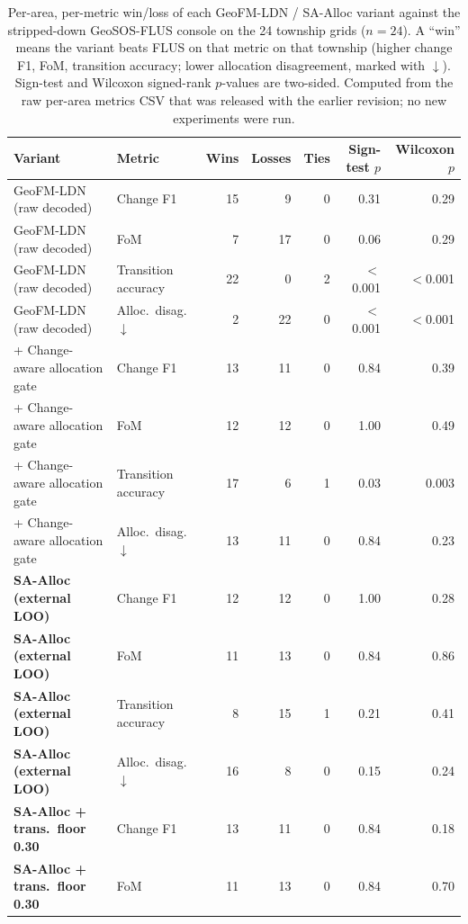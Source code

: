 \documentclass{article}
\begin{document}
\begin{table}[htbp]
\centering
\caption{Per-area, per-metric win/loss of each GeoFM-LDN / SA-Alloc variant against the stripped-down GeoSOS-FLUS console on the 24 township grids ($n=24$). A ``win'' means the variant beats FLUS on that metric on that township (higher change F1, FoM, transition accuracy; lower allocation disagreement, marked with $\downarrow$). Sign-test and Wilcoxon signed-rank $p$-values are two-sided. Computed from the raw per-area metrics CSV that was released with the earlier revision; no new experiments were run.}
\label{tab:flus_per_area_wins}
\footnotesize
\setlength{\tabcolsep}{3pt}
\begin{tabular*}{\textwidth}{@{\extracolsep{\fill}}llrrrrr@{}}
\toprule
Variant & Metric & Wins & Losses & Ties & Sign-test $p$ & Wilcoxon $p$ \\
\midrule
GeoFM-LDN (raw decoded) & Change F1               & 15 & 9  & 0 & 0.31 & 0.29 \\
GeoFM-LDN (raw decoded) & FoM                     & 7  & 17 & 0 & 0.06 & 0.29 \\
GeoFM-LDN (raw decoded) & Transition accuracy     & 22 & 0  & 2 & $<$0.001 & $<$0.001 \\
GeoFM-LDN (raw decoded) & Alloc.\ disag.$\downarrow$ & 2  & 22 & 0 & $<$0.001 & $<$0.001 \\
\midrule
+ Change-aware allocation gate & Change F1               & 13 & 11 & 0 & 0.84 & 0.39 \\
+ Change-aware allocation gate & FoM                     & 12 & 12 & 0 & 1.00 & 0.49 \\
+ Change-aware allocation gate & Transition accuracy     & 17 & 6  & 1 & 0.03 & 0.003 \\
+ Change-aware allocation gate & Alloc.\ disag.$\downarrow$ & 13 & 11 & 0 & 0.84 & 0.23 \\
\midrule
\textbf{SA-Alloc (external LOO)} & Change F1               & 12 & 12 & 0 & 1.00 & 0.28 \\
\textbf{SA-Alloc (external LOO)} & FoM                     & 11 & 13 & 0 & 0.84 & 0.86 \\
\textbf{SA-Alloc (external LOO)} & Transition accuracy     & 8  & 15 & 1 & 0.21 & 0.41 \\
\textbf{SA-Alloc (external LOO)} & Alloc.\ disag.$\downarrow$ & 16 & 8  & 0 & 0.15 & 0.24 \\
\midrule
\textbf{SA-Alloc + trans.\ floor 0.30} & Change F1               & 13 & 11 & 0 & 0.84 & 0.18 \\
\textbf{SA-Alloc + trans.\ floor 0.30} & FoM                     & 11 & 13 & 0 & 0.84 & 0.70 \\

\end{tabular*}
\end{table}
\end{document}
